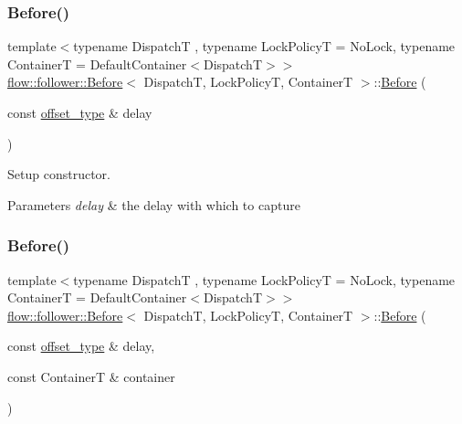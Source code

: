 \subsubsection{\texorpdfstring{Before()}{Before()}\hspace{0.1cm}{\footnotesize\ttfamily [1/2]}}
{\footnotesize\ttfamily template$<$typename DispatchT , typename Lock\+PolicyT  = No\+Lock, typename ContainerT  = Default\+Container$<$\+Dispatch\+T$>$$>$ \\
\hyperlink{classflow_1_1follower_1_1_before}{flow\+::follower\+::\+Before}$<$ DispatchT, Lock\+PolicyT, ContainerT $>$\+::\hyperlink{classflow_1_1follower_1_1_before}{Before} (\begin{DoxyParamCaption}\item[{const \hyperlink{classflow_1_1follower_1_1_before_a5e6ae484915d746be6e4f52706fc3918}{offset\+\_\+type} \&}]{delay }\end{DoxyParamCaption})\hspace{0.3cm}{\ttfamily [explicit]}}



Setup constructor. 


\begin{DoxyParams}{Parameters}
{\em delay} & the delay with which to capture \\
\hline
\end{DoxyParams}
\mbox{\label{classflow_1_1follower_1_1_before_a660d826032cd5bca5e33f850fd446a24}} 
\subsubsection{\texorpdfstring{Before()}{Before()}\hspace{0.1cm}{\footnotesize\ttfamily [2/2]}}
{\footnotesize\ttfamily template$<$typename DispatchT , typename Lock\+PolicyT  = No\+Lock, typename ContainerT  = Default\+Container$<$\+Dispatch\+T$>$$>$ \\
\hyperlink{classflow_1_1follower_1_1_before}{flow\+::follower\+::\+Before}$<$ DispatchT, Lock\+PolicyT, ContainerT $>$\+::\hyperlink{classflow_1_1follower_1_1_before}{Before} (\begin{DoxyParamCaption}\item[{const \hyperlink{classflow_1_1follower_1_1_before_a5e6ae484915d746be6e4f52706fc3918}{offset\+\_\+type} \&}]{delay,  }\item[{const ContainerT \&}]{container }\end{DoxyParamCaption})}



